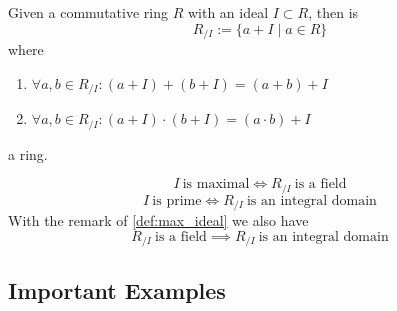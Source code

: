 \begin{definition}
   Given a commutative ring \(R\) with an ideal \(I \subset R\), then is
   \[R_{/I} := \{a + I \mid a \in R\}\]
   where
   \begin{enumerate}[label=\roman*, align=Center]
      \item \(\forall a, b \in R_{/I}: (a + I) + (b + I) = (a + b) + I\)
      \item \(\forall a, b \in R_{/I}: (a + I) \cdot (b + I) = (a \cdot b) + I\)
   \end{enumerate}
   a ring.
\end{definition}
\begin{remark}
   \[I~\text{is maximal} \iff R_{/I}~\text{is a field}\] %
   \[I~\text{is prime} \iff R_{/I}~\text{is an integral domain}\]
   With the remark of \cref{def:max_ideal} we also have
   \[R_{/I}~\text{is a field} \implies R_{/I}~\text{is an integral domain}\]
\end{remark}

\subsection{Important Examples}
